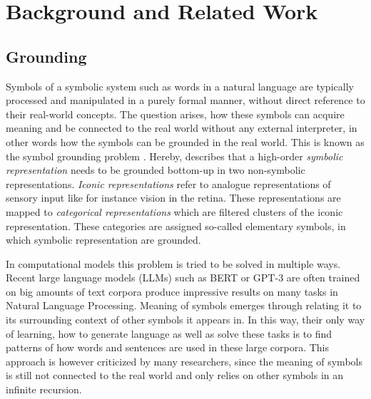 \section{Background and Related Work}
\label{sec:background}

\subsection{Grounding}
Symbols of a symbolic system such as words in a natural language are typically processed and manipulated in a purely formal manner, without direct reference to their real-world concepts.
The question arises, how these symbols can acquire meaning and be connected to the real world without any external interpreter, in other words how the symbols can be grounded in the real world.
This is known as the symbol grounding problem \citep{Harnad1990}.
Hereby, \citet{Harnad1990} describes that a high-order \emph{symbolic representation} needs to be grounded bottom-up in two non-symbolic representations.
\emph{Iconic representations} refer to analogue representations of sensory input like for instance vision in the retina.
These representations are mapped to \emph{categorical representations} which are filtered clusters of the iconic representation.
These categories are assigned so-called elementary symbols, in which symbolic representation are grounded.

In computational models this problem is tried to be solved in multiple ways.
Recent large language models (LLMs) such as BERT \citep{Devlin2019} or GPT-3 \citep{Brown2020} are often trained on big amounts of text corpora produce impressive results on many tasks in Natural Language Processing.
Meaning of symbols emerges through relating it to its surrounding context of other symbols it appears in.
In this way, their only way of learning, how to generate language as well as solve these tasks is to find patterns of how words and sentences are used in these large corpora.
This approach is however criticized by many researchers, since the meaning of symbols is still not connected to the real world and only relies on other symbols in an infinite recursion.

